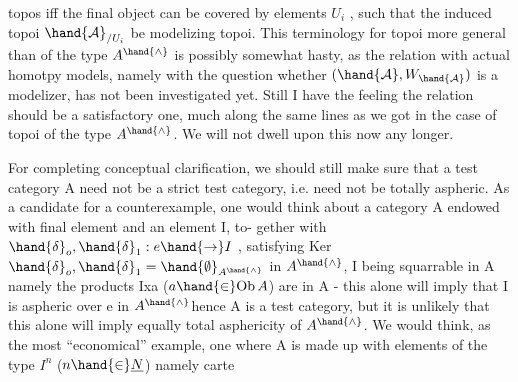 topos iff the final object can be covered by elements $U_i$ ,  such that the
induced topoi $\hand{\mathcal{A}}_{/U_i}$  be modelizing topoi.  This terminology for topoi more
general than of the type $A^{\hand{\wedge}}$ is possibly somewhat hasty,  as the relation
with actual homotpy models,  namely with the question whether $(\hand{\mathcal{A}},W_{\hand{\mathcal{A}}})$ is
a modelizer,  has not been investigated yet.  Still I have the feeling
the relation should be a satisfactory one,  much along the same lines as
we got in the case of topoi of the type $A^{\hand{\wedge}}$.  We will not dwell upon this
now any longer.

For completing conceptual clarification,  we should still make sure
that a test category A need not be a strict test category,  i.e. need
not be totally aspheric.  As a candidate for a counterexample,  one would
think about a category A endowed with final element and an element I,  to-%
gether with $\hand{\delta}_o,\hand{\delta}_1 : e\hand{\to} I$ ,   satisfying Ker $\hand{\delta}_o,\hand{\delta}_1 = \hand{\emptyset}_{A^{\hand{\wedge}}}$
in $A^{\hand{\wedge}}$, I being squarrable in A namely the products Ixa ($a\hand{\in} \mathrm{Ob}\,A$) are in A
-  this alone will imply that I is aspheric over e in $A^{\hand{\wedge}}$\hand{,}hence A is a test
category,  but it is unlikely that this alone will imply equally total 
asphericity of $A^{\hand{\wedge}}$.  We would think,  as the most ``economical'' example,
one where A is made up with elements of the type  $I^n$  ($n\hand{\in}\underline{N}$)  namely carte
